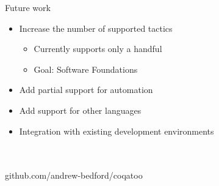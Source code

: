 \documentclass[pdf]{beamer}
\begin{document}
\begin{frame}{Future work}
    \begin{itemize}
        \item Increase the number of supported tactics
        \begin{itemize}
            \item Currently supports only a handful
            \item Goal: Software Foundations
        \end{itemize}
        \item Add partial support for automation
        \item Add support for other languages 
        \item Integration with existing development environments
    \end{itemize}
\end{frame}

\begin{frame}{}{}
    \\~\\
    github.com/andrew-bedford/coqatoo
\end{frame}
\end{document}

